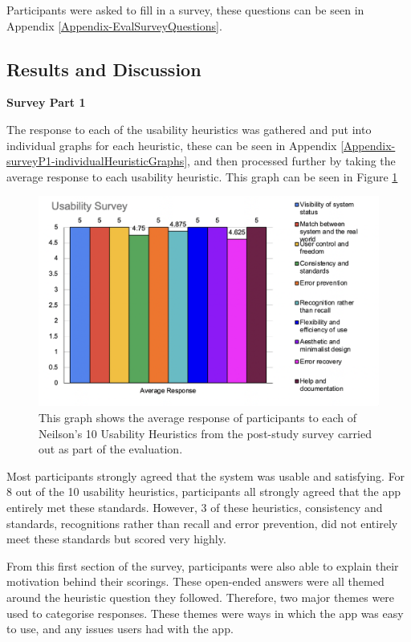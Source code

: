 \documentclass{l4proj}
\begin{document}
Participants were asked to fill in a survey, these questions can be seen in Appendix \ref{Appendix-EvalSurveyQuestions}.


\subsection{Results and Discussion}

\textbf{Survey Part 1}
 
The response to each of the usability heuristics was gathered and put into individual graphs for each heuristic, these can be seen in Appendix \ref{Appendix-surveyP1-individualHeuristicGraphs}, and then processed further by taking the average response to each usability heuristic. This graph can be seen in Figure \ref{fig: UserStudyGraph}

\begin{figure}[H]
    \begin{centering}
    \includegraphics[scale=0.75]{images/UserStudyGraph.png}
    \caption{This graph shows the average response of participants to each of Neilson's 10 Usability Heuristics from the post-study survey carried out as part of the evaluation.}
    \label{fig: UserStudyGraph}
    \end{centering}
\end{figure}
 
Most participants strongly agreed that the system was usable and satisfying. For 8 out of the 10 usability heuristics, participants all strongly agreed that the app entirely met these standards. However, 3 of these heuristics, consistency and standards, recognitions rather than recall and error prevention, did not entirely meet these standards but scored very highly.
 
From this first section of the survey, participants were also able to explain their motivation behind their scorings. These open-ended answers were all themed around the heuristic question they followed. Therefore, two major themes were used to categorise responses. These themes were ways in which the app was easy to use, and any issues users had with the app.
\end{document}
